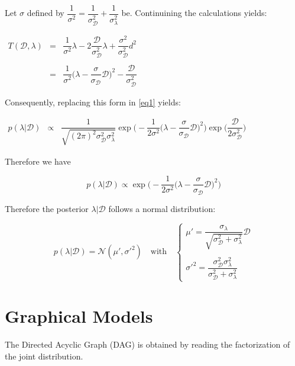 \documentclass[paper=a4, fontsize=11pt]{scrartcl} %
\numberwithin{equation}{section} %
\numberwithin{figure}{section} %
\numberwithin{table}{section} %
\newcounter{count}
\newcommand{\D}{\mathcal{D}}
\newcommand{\N}{\mathcal{N}}
\renewcommand{\sl}{\sigma_\lambda}
\newcommand{\sd}{\sigma_\mathcal{D}}
\begin{document}
Let $\sigma$ defined by $\dfrac{1}{\sigma^2} = \dfrac{1}{\sd^2} + \dfrac{1}{\sl^2} $ be. Continuining the calculations yields:

$
\begin{array}{ccl}

T(\D,\lambda) & = & \dfrac{1}{\sigma^2} \lambda - 2 \dfrac{\D}{\sd^2} \lambda + \dfrac{\sigma^2}{\sd^2} d^2 \\
\\
  & = & \dfrac{1}{\sigma^2} \Big( \lambda - \dfrac{\sigma}{\sd} \D \Big)^2 - \dfrac{\D}{\sd^2}

\end{array}
$

Consequently, replacing this form in \ref{eq1} yields:

$
\begin{array}{ccl}

p(\lambda | \D) & \propto & \dfrac{1}{\sqrt{(2\pi)^2 \sd^2 \sl^2}} \exp \Big( -\dfrac{1}{2\sigma^2} \big( \lambda - \dfrac{\sigma}{\sd} \D \big)^2 \Big) \exp \big( \dfrac{\D}{2 \sd^2} \big)

\end{array}
$

Therefore we have 

\begin{equation}
	p(\lambda | \D) \propto \exp \Big( - \dfrac{1}{2 \sigma^2} \big( \lambda - \dfrac{\sigma}{\sd} \D \big)^2 \Big)
\end{equation}

Therefore the posterior $\lambda | \D$ follows a normal distribution:

\begin{equation}
\boxed{p(\lambda | \D) = \N(\mu',\sigma'^2) \quad \text{with} \quad \begin{cases}
	\mu' = \dfrac{\sl}{\sqrt{\sd^2 + \sl^2}} \D\\
	\\
	\sigma'^2 = \dfrac{\sd^2 \sl^2}{\sd^2 + \sl^2}
\end{cases} } 
\end{equation}

\bigskip

\section{Graphical Models}

\begin{list}{\textbf{Question  -}}{}
	\item The Directed Acyclic Graph (DAG) is obtained by reading the factorization of the joint distribution.
\end{list}
\end{document}
